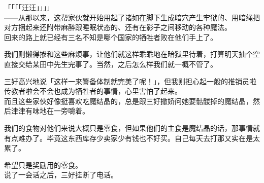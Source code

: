「「「「汪汪」」」」\\

——从那以来，这帮家伙就开始用起了诸如在脚下生成暗穴产生牢狱的、用暗绳把对方捆起来还附带麻醉跟睡眠状态的、还有在影子之间移动的各种魔法。\\

回来的路上就已经有三名不知是哪个国家的牺牲者败在他们手上了。

我们则懒得掺和这些麻烦事，让他们就这样乖乖地在暗狱里待着，打算明天抽个空直接交给某田中先生完事了。当然，之后怎么样我们就一概不管了。

三好高兴地说「这样一来警备体制就完美了呢！」，但我则担心起一般的推销员啦传教者啦会不会也成为牺牲者的事情，心里害怕了起来。\\

而且这些家伙好像挺喜欢吃魔结晶的，总是跟三好撒娇问她要骷髅掉的魔结晶，然后津津有味地在一旁嚼着。

我们的食物对他们来说大概只是零食，但如果他们的主食是魔结晶的话，那事情就有点难办了。毕竟这东西库存少卖家少有钱也不好买。自己每天去打那又实在是太累了。

希望只是奖励用的零食。\\

说了一会话之后，三好挂断了电话。\\

